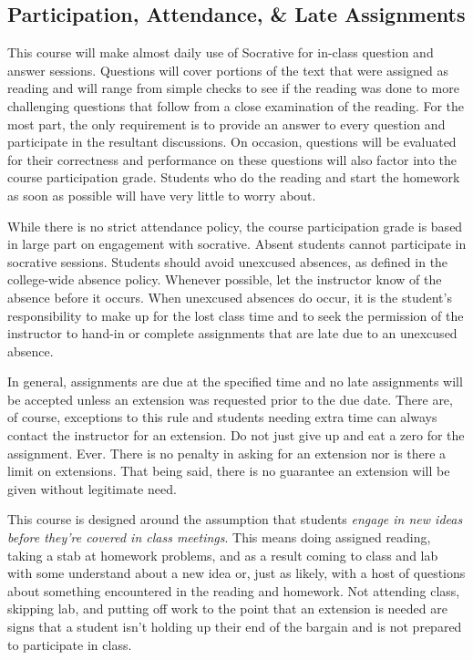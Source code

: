 \documentclass[10pt]{article}
\begin{document}
\subsection{Participation, Attendance, \& Late Assignments}

This course will make almost daily use of Socrative for in-class question and answer sessions. Questions will cover portions of the text that were assigned as reading and will range from simple checks to see if the reading was done to more challenging questions that follow from a close examination of the reading.  For the most part, the only requirement is to provide an answer to every question and participate in the resultant discussions.  On occasion, questions will be evaluated for their correctness and performance on these questions will also factor into the course participation grade.  Students who do the reading and start the homework as soon as possible will have very little to worry about.

While there is no strict attendance policy, the course participation grade is based in large part on engagement with socrative. Absent students cannot participate in socrative sessions.  Students should avoid unexcused absences, as defined in the college-wide absence policy. Whenever possible, let the instructor know of the absence before it occurs. When unexcused absences do occur, it is the student's responsibility to make up for the lost class time and to seek the permission of the instructor to hand-in or complete assignments that are late due to an unexcused absence.

In general, assignments are due at the specified time and no late assignments will be accepted unless an extension was requested prior to the due date. There are, of course, exceptions to this rule and students needing extra time can always contact the instructor for an extension. Do not just give up and eat a zero for the assignment. Ever. There is no penalty in asking for an extension nor is there a limit on extensions.  That being said, there is no guarantee an extension will be given without legitimate need.

This course is designed around the assumption that students \textit{engage in new ideas before they're covered in class meetings}.  This means doing assigned reading, taking a stab at homework problems, and as a result coming to class and lab with some understand about a new idea or, just as likely, with a host of questions about something encountered in the reading and homework. Not attending class, skipping lab, and putting off work to the point that an extension is needed are signs that a student isn't holding up their end of the bargain and is not prepared to participate in class.
\end{document}
